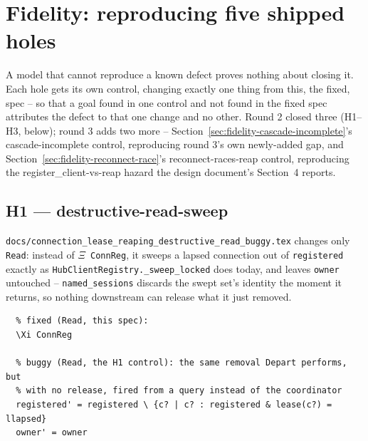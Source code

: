 \documentclass[a4paper,10pt,fleqn]{article}
\begin{document}
\section{Fidelity: reproducing five shipped holes}
\label{sec:fidelity}

A model that cannot reproduce a known defect proves nothing about closing
it. Each hole gets its own control, changing exactly one thing from this,
the fixed, spec -- so that a goal found in one control and not found in
the fixed spec attributes the defect to that one change and no other.
Round 2 closed three (H1--H3, below); round 3 adds two more --
Section~\ref{sec:fidelity-cascade-incomplete}'s cascade-incomplete control,
reproducing round 3's own newly-added gap, and
Section~\ref{sec:fidelity-reconnect-race}'s reconnect-races-reap control,
reproducing the register\_client-vs-reap hazard the design document's
Section~4 reports.

\subsection{H1 --- destructive-read-sweep}
\label{sec:fidelity-h1}

\texttt{docs/connection\_lease\_reaping\_destructive\_read\_buggy.tex}
changes only \texttt{Read}: instead of \texttt{$\Xi$ ConnReg}, it sweeps a
lapsed connection out of \texttt{registered} exactly as
\texttt{HubClientRegistry.\_sweep\_locked} does today, and leaves
\texttt{owner} untouched -- \texttt{named\_sessions} discards the swept
set's identity the moment it returns, so nothing downstream can release
what it just removed.

\begin{verbatim}
  % fixed (Read, this spec):
  \Xi ConnReg

  % buggy (Read, the H1 control): the same removal Depart performs, but
  % with no release, fired from a query instead of the coordinator
  registered' = registered \ {c? | c? : registered & lease(c?) = llapsed}
  owner' = owner
\end{verbatim}
\end{document}
